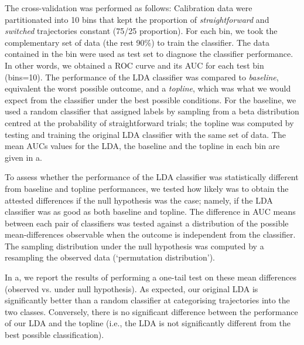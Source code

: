 \documentclass{article}
\begin{document}
The cross-validation was performed as follows: Calibration data were partitionated into 10 bins that kept the proportion of \textit{straightforward} and \textit{switched} trajectories constant (75/25 proportion). For each bin, we took the complementary set of data (the rest 90\%) to train the classifier. The data contained in the bin were used as test set to diagnose the classifier performance. In other words, we obtained a ROC curve and its AUC for each test bin (bins=10). The performance of the LDA classifier was compared to \emph{baseline}, equivalent the worst possible outcome, and a \emph{topline}, which was what we would expect from the classifier under the best possible conditions. 
For the baseline, we used a random classifier that assigned labels by sampling from a beta distribution centred at the probability of straightforward trials; the topline was computed by testing and training the original LDA classifier with the same set of data. 
The mean AUCs values for the LDA, the baseline and the topline in each bin are given in a. 

To assess whether the performance of the LDA classifier was statistically different from baseline and topline performances, we tested how likely was to obtain the attested differences if the null hypothesis was the case; namely, if the LDA classifier was as good as both baseline and topline.   
The difference in AUC means between each pair of classifiers was tested against a distribution of the possible mean-differences observable when the outcome is independent from the classifier. 
The sampling distribution under the null hypothesis was computed by a resampling the observed data (`permutation distribution'). 

In a, we report the results of performing a one-tail test on these mean differences (observed vs. under null hypothesis). As expected, our original LDA is significantly better than a random classifier at categorising trajectories into the two classes. Conversely, there is no significant difference between the performance of our LDA and the topline (i.e., the LDA is not significantly different from the best possible classification). 
\end{document}
